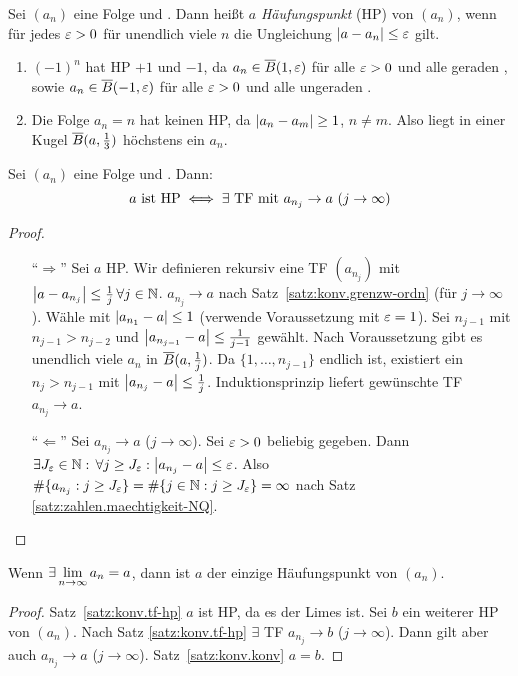\documentclass[12pt]{scrreprt}
\begin{document}
\begin{dfn}
  \label{dfn:konv.hp}
  Sei $(a_n)$ eine Folge und . Dann heißt $a$
  \emph{Häufungspunkt} (HP) von $(a_n)$, wenn für jedes $\varepsilon>0$ für
  unendlich viele $n$ die Ungleichung $\left\lvert a-a_n\right\lvert\le\varepsilon$ gilt.
\end{dfn}
\begin{bsp*}
  \begin{enumerate}
  \item $(-1)^n$ hat HP $+1$ und $-1$, da $a_n\in\overline{B}(1,\varepsilon)$ für
    alle $\varepsilon>0$ und alle geraden , sowie
    $a_n\in\overline{B}(-1,\varepsilon)$ für alle $\varepsilon>0$ und alle ungeraden
    .
  \item Die Folge $a_n=n$ hat keinen HP, da $\left\lvert a_n-a_m\right\lvert\ge1$, $n\ne
    m$. Also liegt in einer Kugel $\overline{B}(a, \frac13)$ höchstens ein
    $a_n$.
  \end{enumerate}
\end{bsp*}

\begin{satz}
  \label{satz:konv.tf-hp}
  Sei $(a_n)$ eine Folge und . Dann:
  \[a \text{ ist HP} \iff \exists \text{ TF mit } a_{n_j} \to a \
  (j\to\infty)\]
\end{satz}
\begin{proof}
  \begin{enumerate}
  \item["`$\Rightarrow$"'] Sei $a$ HP. Wir definieren rekursiv eine TF
    $(a_{n_j})$ mit
    $\left\lvert a-a_{n_j}\right\lvert\le\frac1j\,\forall j\in\mathbb{N}$. \folgt $a_{n_j}\to a$
    nach Satz~\ref{satz:konv.grenzw-ordn} (für $j\to\infty$). Wähle
    \nat{n_1} mit $\left\lvert a_{n_1}-a\right\lvert\le1$ (verwende Voraussetzung mit
    $\varepsilon=1$). Sei $n_{j-1}$ mit $n_{j-1}>n_{j-2}$ und
    $\left\lvert a_{n_{j-1}}-a\right\lvert\le\frac{1}{j-1}$ gewählt. Nach Voraussetzung
    gibt es unendlich viele $a_n$ in $\overline{B}(a,\frac1j)$. Da
    $\{1,\dotsc,n_{j-1}\}$ endlich ist, existiert ein $n_j>n_{j-1}$
    mit $\left\lvert a_{n_j}-a\right\lvert\le\frac1j$. Induktionsprinzip liefert
    gewünschte TF $a_{n_j}\to a$.
  \item["`$\Leftarrow$"'] Sei $a_{n_j}\to a$ ($j\to\infty$). Sei
    $\varepsilon>0$ beliebig gegeben. Dann $\exists J_\varepsilon\in\mathbb{N}:\,\forall j\ge
    J_\varepsilon:\left\lvert a_{n_j}-a\right\lvert\le\varepsilon$. Also $\#\{a_{n_j}:j\ge J_\varepsilon\} =
    \#\{j\in\mathbb{N}:j\ge J_\varepsilon\}=\infty$ nach Satz
    \ref{satz:zahlen.maechtigkeit-NQ}.
  \end{enumerate}
\end{proof}

\begin{kor}
  \label{kor:konv.lim-hp}
  Wenn $\exists\lim\limits_{n\rightarrow\infty}{a_n}=a$, dann ist $a$ der einzige
  Häufungspunkt von $(a_n)$.
\end{kor}
\begin{proof}
  Satz~\ref{satz:konv.tf-hp} \folgt $a$ ist HP, da es der Limes
  ist. Sei $b$ ein weiterer HP von $(a_n)$. Nach Satz
  \ref{satz:konv.tf-hp} $\exists$ TF $a_{n_j}\to b$
  ($j\to\infty$). Dann gilt aber auch $a_{n_j}\to a$
  ($j\to\infty$). Satz~\ref{satz:konv.konv} \folgt $a=b$.
\end{proof}
\end{document}
